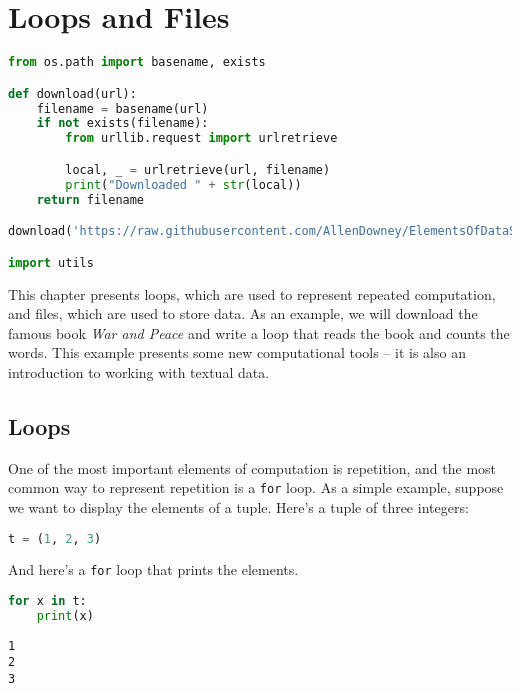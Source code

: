 \hypertarget{loops-and-files}{%
\chapter{Loops and Files}\label{loops-and-files}}

\begin{lstlisting}[language=Python,style=source]
from os.path import basename, exists

def download(url):
    filename = basename(url)
    if not exists(filename):
        from urllib.request import urlretrieve

        local, _ = urlretrieve(url, filename)
        print("Downloaded " + str(local))
    return filename

download('https://raw.githubusercontent.com/AllenDowney/ElementsOfDataScience/v1/utils.py')

import utils
\end{lstlisting}

This chapter presents loops, which are used to represent repeated
computation, and files, which are used to store data. As an example, we
will download the famous book \emph{War and Peace} and write a loop that
reads the book and counts the words. This example presents some new
computational tools -- it is also an introduction to working with
textual data.

\hypertarget{loops}{%
\section{Loops}\label{loops}}

One of the most important elements of computation is repetition, and the
most common way to represent repetition is a
\passthrough{\lstinline!for!} loop. As a simple example, suppose we want
to display the elements of a tuple. Here's a tuple of three integers:

\begin{lstlisting}[language=Python,style=source]
t = (1, 2, 3)
\end{lstlisting}

And here's a \passthrough{\lstinline!for!} loop that prints the
elements.

\begin{lstlisting}[language=Python,style=source]
for x in t:
    print(x)
\end{lstlisting}

\begin{lstlisting}[style=output]
1
2
3
\end{lstlisting}

